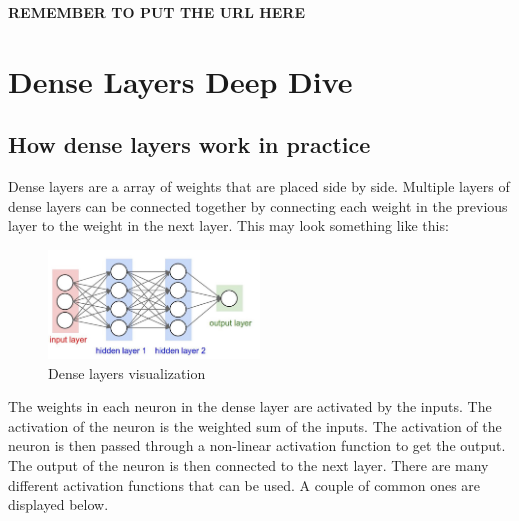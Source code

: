 \documentclass[11pt]{report}
\begin{document}
\textbf{REMEMBER TO PUT THE URL HERE}

\pagebreak

\chapter{Dense Layers Deep Dive}
\section{How dense layers work in practice}
Dense layers are a array of weights that are placed side by side. Multiple layers of dense layers can be connected together by connecting each weight in the previous layer to the weight in the next layer. This may look something like this:

    \begin{figure}[h]
        \begin{center}
        \includegraphics[width=0.5\textwidth]{denselayers.jpeg}
        \caption{Dense layers visualization}
        \label{fig:dense_layers}
        \end{center}
    \end{figure}

The weights in each neuron in the dense layer are activated by the inputs. The activation of the neuron is the weighted sum of the inputs. The activation of the neuron is then passed through a non-linear activation function to get the output. The output of the neuron is then connected to the next layer. There are many different activation functions that can be used. A couple of common ones are displayed below.
\end{document}
